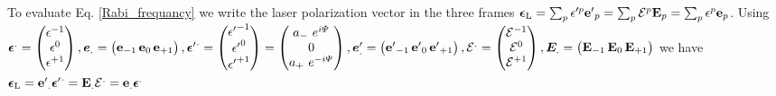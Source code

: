 \documentclass[amsmath,amssymb,nofootinbib]{revtex4-2}
\begin{document}
	 	To evaluate Eq. \ref{Rabi_frequancy} we
	 	  write the laser polarization vector in the three frames  	
 $ {\bm \epsilon}_{\rm L} =
	\sum_p \epsilon'^p 
	{\bf e'}_{p}  = 	\sum_p \mathcal{E}^p
	{\bf E}_{p} = \sum_p \epsilon^p
	{\bf e}_{p}
	$.
	Using  $ {\bm \epsilon}^. = \begin{pmatrix} \epsilon^{-1} \\ \epsilon^{0} \\ \epsilon^{+1}
	\end{pmatrix},   {\bm e}_. = \begin{pmatrix} 	{\bf e}_{-1}  \,	{\bf e}_{0}  \,	{\bf e}_{+1}
	\end{pmatrix}, 
	{{\bm \epsilon}'}^. = \begin{pmatrix} {\epsilon'}^{-1} \\ {\epsilon'}^{0} \\ {\epsilon'}^{+1}
	\end{pmatrix} = \begin{pmatrix}a_{-} \ e^{i \Psi}  \\ 0 \\ a_{+} \ e^{-i \Psi}
	\end{pmatrix} ,   {\bm e}'_. = \begin{pmatrix} 	{\bf e'}_{-1} \, 	{\bf e'}_{0} \,	{\bf e'}_{+1}
	\end{pmatrix}, 
	{\mathcal{\bm  E}}^. = \begin{pmatrix} \mathcal{E}^{-1} \\ \mathcal{E}^{0} \\ \mathcal{E}^{+1}
	\end{pmatrix},   {\bm E}_. = \begin{pmatrix} 	{\bf E}_{-1} \,	{\bf E}_{0} \,	{\bf E}_{+1}
	\end{pmatrix}$ we have 
	 $ {\bm \epsilon}_{\rm L} = {\bf e'}_. {\bm \epsilon'}^.   =   {\bf E}_. \mathcal{\bm E}^. =  {\bf e}_. {\bm \epsilon}^.  $

	
	
\end{document}
